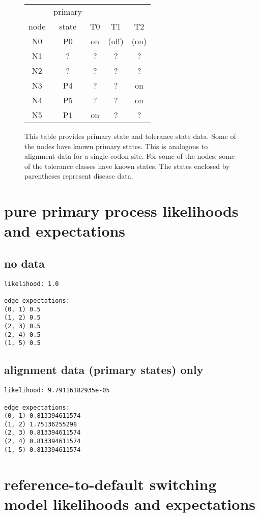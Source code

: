 \documentclass{article}
\begin{document}
\begin{figure}
\centering
\begin{tabular}{c c c c c}
	     & primary &    &    &    \\
	node & state   & T0 & T1 & T2 \\
  \hline
  N0 & P0 & on & (off) & (on) \\
  N1 & ? & ? & ? & ? \\
  N2 & ? & ? & ? & ? \\
  N3 & P4 & ? & ? & on \\
  N4 & P5 & ? & ? & on \\
  N5 & P1 & on & ? & ?
\end{tabular}
\caption{
	This table provides primary state and tolerance state data.
	Some of the nodes have known primary states.
	This is analogous to alignment data for a single codon site.
	For some of the nodes,
	some of the tolerance classes have known states.
	The states enclosed by parentheses represent
	disease data.
}
\end{figure}


\section{pure primary process likelihoods and expectations}

\subsection{no data}
\begin{verbatim}
likelihood: 1.0

edge expectations:
(0, 1) 0.5
(1, 2) 0.5
(2, 3) 0.5
(2, 4) 0.5
(1, 5) 0.5
\end{verbatim}

\subsection{alignment data (primary states) only}
\begin{verbatim}
likelihood: 9.79116182935e-05

edge expectations:
(0, 1) 0.813394611574
(1, 2) 1.75136255298
(2, 3) 0.813394611574
(2, 4) 0.813394611574
(1, 5) 0.813394611574
\end{verbatim}

\section{reference-to-default switching model likelihoods and expectations}
\end{document}
